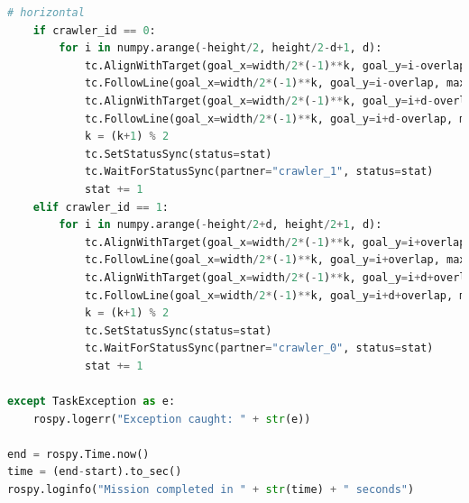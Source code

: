 \documentclass[francais,RandD]{rapportPFE}
\begin{document}
\begin{lstlisting}[language=Python,caption={Implémentation de l'algorithme de peinture au rouleau},label=lst:peinture_au_rouleau]
	# horizontal
	if crawler_id == 0:
		for i in numpy.arange(-height/2, height/2-d+1, d):
			tc.AlignWithTarget(goal_x=width/2*(-1)**k, goal_y=i-overlap)
			tc.FollowLine(goal_x=width/2*(-1)**k, goal_y=i-overlap, max_velocity=vel)
			tc.AlignWithTarget(goal_x=width/2*(-1)**k, goal_y=i+d-overlap)
			tc.FollowLine(goal_x=width/2*(-1)**k, goal_y=i+d-overlap, max_velocity=vel)
			k = (k+1) % 2
			tc.SetStatusSync(status=stat)
			tc.WaitForStatusSync(partner="crawler_1", status=stat)
			stat += 1
	elif crawler_id == 1:
		for i in numpy.arange(-height/2+d, height/2+1, d):
			tc.AlignWithTarget(goal_x=width/2*(-1)**k, goal_y=i+overlap)
			tc.FollowLine(goal_x=width/2*(-1)**k, goal_y=i+overlap, max_velocity=vel)
			tc.AlignWithTarget(goal_x=width/2*(-1)**k, goal_y=i+d+overlap)
			tc.FollowLine(goal_x=width/2*(-1)**k, goal_y=i+d+overlap, max_velocity=vel)
			k = (k+1) % 2
			tc.SetStatusSync(status=stat)
			tc.WaitForStatusSync(partner="crawler_0", status=stat)
			stat += 1

except TaskException as e:
	rospy.logerr("Exception caught: " + str(e))

end = rospy.Time.now()
time = (end-start).to_sec()
rospy.loginfo("Mission completed in " + str(time) + " seconds")
		\end{lstlisting}
\end{document}
